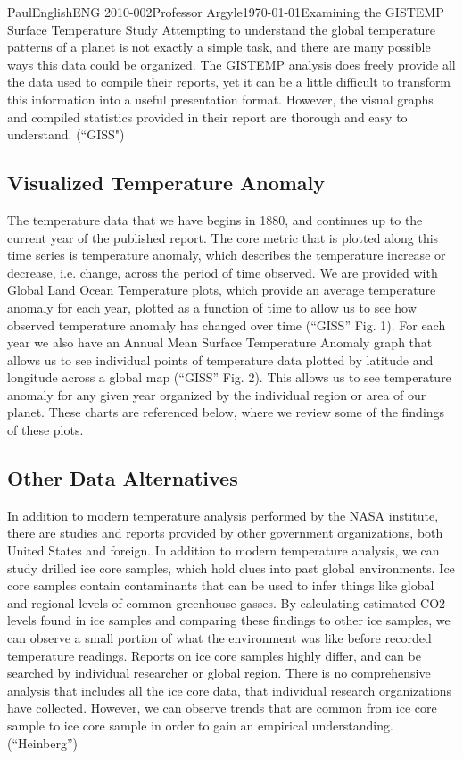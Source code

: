 \documentclass[12pt,letterpaper]{article}
\begin{document}
\begin{mla}{Paul}{English}{ENG 2010-002}{Professor Argyle}{\today}{Examining the GISTEMP Surface Temperature Study}
Attempting to understand the global temperature patterns of a planet is not exactly a simple task, and there are many possible ways this data could be organized. The GISTEMP analysis does freely provide all the data used to compile their reports, yet it can be a little difficult to transform this information into a useful presentation format. However, the visual graphs and compiled statistics provided in their report are thorough and easy to understand. (``GISS")

\subsection{Visualized Temperature Anomaly}
The temperature data that we have begins in 1880, and continues up to the current year of the published report. The core metric that is plotted along this time series is temperature anomaly, which describes the temperature increase or decrease, i.e. change, across the period of time observed. We are provided with Global Land Ocean Temperature plots, which provide an average temperature anomaly for each year, plotted as a function of time to allow us to see how observed temperature anomaly has changed over time (``GISS'' Fig. 1). For each year we also have an Annual Mean Surface Temperature Anomaly graph that allows us to see individual points of temperature data plotted by latitude and longitude across a global map (``GISS'' Fig. 2). This allows us to see temperature anomaly for any given year organized by the individual region or area of our planet. These charts are referenced below, where we review some of the findings of these plots.

\subsection{Other Data Alternatives}
In addition to modern temperature analysis performed by the NASA institute, there are studies and reports provided by other government organizations, both United States and foreign. In addition to modern temperature analysis, we can study drilled ice core samples, which hold clues into past global environments. Ice core samples contain contaminants that can be used to infer things like global and regional levels of common greenhouse gasses. By calculating estimated CO2 levels found in ice samples and comparing these findings to other ice samples, we can observe a small portion of what the environment was like before recorded temperature readings. Reports on ice core samples highly differ, and can be searched by individual researcher or global region. There is no comprehensive analysis that includes all the ice core data, that individual research organizations have collected. However, we can observe trends that are common from ice core sample to ice core sample in order to gain an empirical understanding. (``Heinberg'')


\end{mla}
\end{document}
